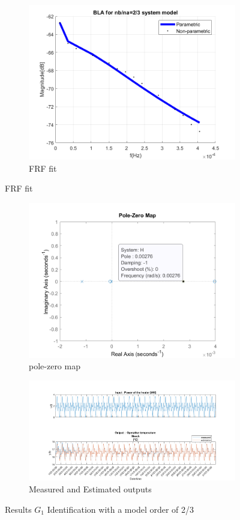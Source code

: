 \documentclass[a4paper,12pt]{report}
\numberwithin{equation}{section}
\begin{document}
\begin{figure}[H]
\centering
\begin{subfigure}{\textwidth}
  \centering
  \includegraphics[width=.6\linewidth]{G1mod23FrfFit.png}
  \caption{FRF fit}
  \label{fig:frf fit G1mod2/3}
\end{subfigure}
\end{figure}
\clearpage
\begin{figure}[H]\ContinuedFloat
\begin{subfigure}{\textwidth}
  \centering
  \includegraphics[width=.6\linewidth]{G1mod23pzmap.png}
  \caption{pole-zero map}
  \label{fig:pzmap G1mod2/3}
\end{subfigure}

\begin{subfigure}{\textwidth}
  \centering
  \includegraphics[scale=0.3]{G1mod23InOut.png}
  \caption{Measured and Estimated outputs}
  \label{fig:inoutG12/3}
\end{subfigure}
\caption{Results $G_{1}$ Identification with a model order of 2/3 }
\label{fig:G1mod2/3}
\end{figure}
\end{document}
